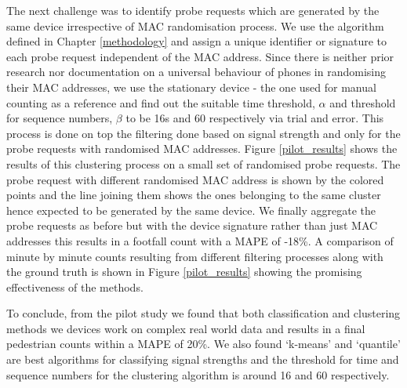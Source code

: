 The next challenge was to identify probe requests which are generated by the same device irrespective of MAC randomisation process.
We use the algorithm defined in Chapter \ref{methodology} and assign a unique identifier or signature to each probe request independent of the MAC address. 
Since there is neither prior research nor documentation on a universal behaviour of phones in randomising their MAC addresses, we use the stationary device - the one used for manual counting as a reference and find out the suitable time threshold, $\alpha$ and threshold for sequence numbers, $\beta$ to be 16s and 60 respectively via trial and error.
This process is done on top the filtering done based on signal strength and only for the probe requests with randomised MAC addresses.
Figure \ref{pilot_results} shows the results of this clustering process on a small set of randomised probe requests.
The probe request with different randomised MAC address is shown by the colored points and the line joining them shows the ones belonging to the same cluster hence expected to be generated by the same device.
We finally aggregate the probe requests as before but with the device signature rather than just MAC addresses this results in a footfall count with a MAPE of -18\%. 
A comparison of minute by minute counts resulting from different filtering processes along with the ground truth is shown in Figure \ref{pilot_results} showing the promising effectiveness of the methods.

To conclude, from the pilot study we found that both classification and clustering methods we devices work on complex real world data and results in a final pedestrian counts within a MAPE of 20\%. We also found `k-means' and `quantile' are best algorithms for classifying signal strengths and the threshold for time and sequence numbers for the clustering algorithm is around 16 and 60 respectively.
